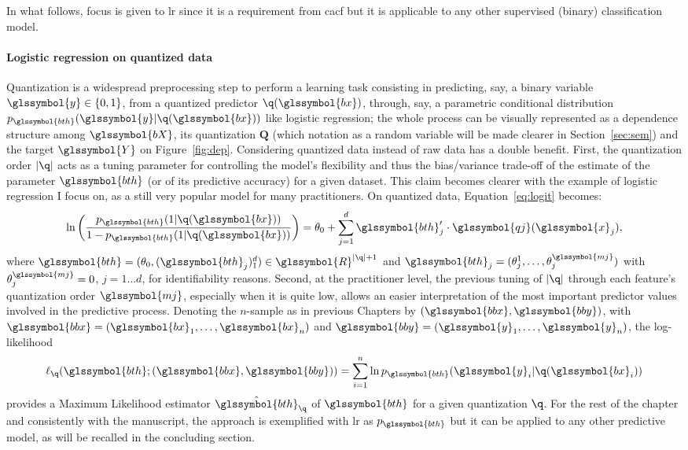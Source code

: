 In what follows, focus is given to \gls{lr} since it is a requirement from \gls{cacf} but it is applicable to any other supervised (binary) classification model.

\paragraph{Logistic regression on quantized data}

Quantization is a widespread preprocessing step to perform a learning task consisting in predicting, say, a binary variable $\glssymbol{y}\in\{0,1\}$, from a quantized predictor  $\q(\glssymbol{bx})$, through, say, a parametric conditional distribution $p_{\glssymbol{bth}}(\glssymbol{y}|\q(\glssymbol{bx}))$ like logistic regression; the whole process can be visually represented as a dependence structure among $\glssymbol{bX}$, its quantization $\bm{Q}$ (which notation as a random variable will be made clearer in Section~\ref{sec:sem}) and the target $\glssymbol{Y}$ on Figure~\ref{fig:dep}. Considering quantized data instead of raw data has a double benefit. First, the quantization order $|\q|$ acts as a tuning parameter for controlling the model's flexibility and thus the bias/variance trade-off of the estimate of the parameter $\glssymbol{bth}$ (or of its predictive accuracy) for a given dataset. This claim becomes clearer with the example of logistic regression I focus on, as a still very popular model for many practitioners. On quantized data, Equation~\eqref{eq:logit} becomes:
\begin{equation}
    \label{eq:reglogq}
\ln \left( \dfrac{p_{\glssymbol{bth}}(1|\q(\glssymbol{bx}))}{1 - p_{\glssymbol{bth}}(1|\q(\glssymbol{bx}))} \right) = \theta_0 + \sum_{j=1}^d \glssymbol{bth}_j' \cdot \glssymbol{qj}(\glssymbol{x}_j),
\end{equation}
where $\glssymbol{bth} = (\theta_{0},(\glssymbol{bth}_j)_1^d) \in \glssymbol{R}^{|\q|+1}$ and $\glssymbol{bth}_j = (\theta_{j}^{1},\dots,\theta_{j}^{\glssymbol{mj}})$ with $\theta_{j}^{\glssymbol{mj}} = 0$, $j=1 \ldots d$, for identifiability reasons.
Second, at the practitioner level, the previous tuning of $|\q|$ through each feature's quantization order $\glssymbol{mj}$, especially when it is quite low, allows an easier interpretation of the most important predictor values involved in the predictive process. Denoting the $n$-sample as in previous Chapters by $(\glssymbol{bbx},\glssymbol{bby})$, with $\glssymbol{bbx}=(\glssymbol{bx}_1,\ldots,\glssymbol{bx}_n)$ and $\glssymbol{bby}=(\glssymbol{y}_1,\ldots,\glssymbol{y}_n)$, the log-likelihood 
\begin{equation}
\label{eq:lq}
\ell_{\q}(\glssymbol{bth} ; (\glssymbol{bbx},\glssymbol{bby}))=\sum_{i=1}^n \ln p_{\glssymbol{bth}}(\glssymbol{y}_i|\q(\glssymbol{bx}_i))
\end{equation}
provides a Maximum Likelihood estimator $\hat{\glssymbol{bth}}_{\q}$ of $\glssymbol{bth}$ for a given quantization $\q$. For the rest of the chapter and consistently with the manuscript, the approach is exemplified with \gls{lr} as $p_{\glssymbol{bth}}$ but it can be applied to any other predictive model, as will be recalled in the concluding section.



